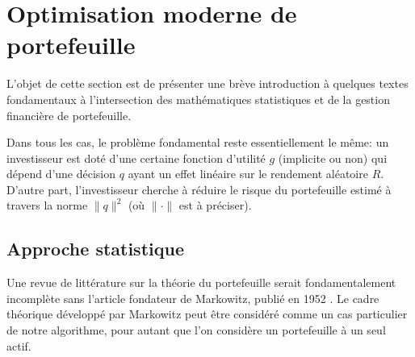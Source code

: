 \section{Optimisation moderne de portefeuille}
\label{sec:portopt}

L'objet de cette section est de présenter une brève introduction à quelques textes
fondamentaux à l'intersection des mathématiques statistiques et de la gestion financière
de portefeuille.

Dans tous les cas, le problème fondamental reste essentiellement le même: un investisseur
est doté d'une certaine fonction d'utilité $g$ (implicite ou non) qui dépend d'une
décision $q$ ayant un effet linéaire sur le rendement aléatoire $R$. D'autre part,
l'investisseur cherche à réduire le risque du portefeuille estimé à travers la norme
$\|q\|^2$ (où $\|\cdot\|$ est à préciser).



\subsection{Approche statistique}

Une revue de littérature sur la théorie du portefeuille serait fondamentalement incomplète
sans l'article fondateur de Markowitz, publié en 1952 \cite{markowitz1952portfolio}. Le
cadre théorique développé par Markowitz peut être considéré comme un cas particulier de
notre algorithme, pour autant que l'on considère un portefeuille à un seul actif.

